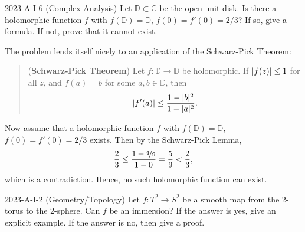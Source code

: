 \documentclass{article}
\begin{document}
\begin{prb}{2023-A-I-6 (Complex Analysis)}
	Let $\mathbb{D} \subset \mathbb{C}$ be the open unit disk. Is there a holomorphic function $f$ with $f(\mathbb{D}) = \mathbb{D}$, $f(0) = f'(0) = 2/3$? If so, give a formula. If not, prove that it cannot exist. 
\end{prb}
\begin{solutions}
	The problem lends itself nicely to an application of the Schwarz-Pick Theorem: 
		\begin{quote}
			(\textbf{Schwarz-Pick Theorem}) Let $f: \mathbb{D} \to \mathbb{D}$ be holomorphic. If $\left| f(z) \right| \leq 1$ for all $z$, and $f(a) = b$ for some $a, b \in \mathbb{D}$, then 
				\begin{equation*}
					\left| f'(a) \right| \leq \frac{1 - |b|^{2}}{1 - |a|^{2}}.
				\end{equation*}
		\end{quote}
	Now assume that a holomorphic function $f$ with $f(\mathbb{D}) = \mathbb{D}$, $f(0) = f'(0) = 2/3$ exists. Then by the Schwarz-Pick Lemma, 
		\begin{equation}
			\frac{2}{3} \leq \frac{1 - \nicefrac{4}{9}}{1 - 0} = \frac{5}{9} < \frac{2}{3}, 
		\end{equation}
	which is a contradiction. Hence, no such holomorphic function can exist. 
\end{solutions}
\begin{prb}{2023-A-I-2 (Geometry/Topology)}
	Let $f: T^{2} \to S^{2}$ be a smooth map from the 2-torus to the 2-sphere. Can $f$ be an immersion? If the answer is yes, give an explicit example. If the answer is no, then give a proof. 
\end{prb}
\end{document}
